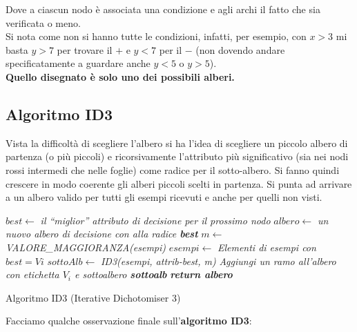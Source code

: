 \begin{esempio}
\begin{figure}[H]
  \end{figure}
  Dove a ciascun nodo è associata una condizione e agli archi il fatto che sia
  verificata o meno.\\
  Si nota come non si hanno tutte le condizioni, infatti, per esempio, con $x>3$
  mi basta $y>7$ per trovare il $+$ e $y<7$ per il $-$ (non dovendo andare
  specificatamente a guardare anche $y<5$ o $y>5$).\\
  \textbf{Quello disegnato è solo uno dei possibili alberi.}
\end{esempio}

\subsection{Algoritmo ID3}
Vista la difficoltà di scegliere l'albero si ha l'idea di scegliere un piccolo
albero di partenza (o più piccoli) e ricorsivamente l'attributo più
significativo (sia nei nodi rossi intermedi che nelle foglie) come radice per il
sotto-albero. Si fanno quindi crescere in modo 
coerente gli alberi piccoli scelti in partenza. Si punta ad arrivare a un
albero valido per tutti gli esempi ricevuti e anche per quelli non visti.\\
\begin{algorithm}[H]
  \begin{algorithmic}
    \EndIf
    \EndIf
    \EndIf
    \State $best \gets$ \textit{il ``miglior'' attributo di decisione per il
    prossimo nodo}
    \State $albero \gets$ \textit{un nuovo albero di decisione con alla radice \textbf{best}}
    \State $m \gets$ \textit{VALORE\_MAGGIORANZA(esempi)}
    \State $esempi \gets$ \textit{Elementi di esempi con $best = Vi$}
    \State $sottoAlb \gets$ \textit{ID3(esempi, attrib-best, m)}
    \State \textit{Aggiungi un ramo all'albero con etichetta $V_i$ e sottoalbero \textbf{sottoalb}}
    \EndFor
    \State \textit{\textbf{return albero}}
    \EndFunction
  \end{algorithmic}
  \caption{Algoritmo ID3 (Iterative Dichotomiser 3)}
\end{algorithm}
Facciamo qualche osservazione finale sull'\textbf{algoritmo ID3}:

